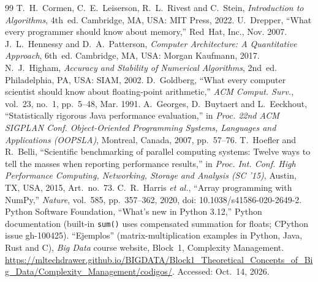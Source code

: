 \begin{thebibliography}{99}
 T.~H.~Cormen, C.~E.~Leiserson, R.~L.~Rivest and C.~Stein, \emph{Introduction to Algorithms}, 4th~ed. Cambridge, MA, USA: MIT Press, 2022.
 U.~Drepper, ``What every programmer should know about memory,'' Red~Hat, Inc., Nov. 2007.
 J.~L.~Hennessy and D.~A.~Patterson, \emph{Computer Architecture: A Quantitative Approach}, 6th~ed. Cambridge, MA, USA: Morgan Kaufmann, 2017.
 N.~J.~Higham, \emph{Accuracy and Stability of Numerical Algorithms}, 2nd~ed. Philadelphia, PA, USA: SIAM, 2002.
 D.~Goldberg, ``What every computer scientist should know about floating-point arithmetic,'' \emph{ACM Comput. Surv.}, vol.~23, no.~1, pp.~5--48, Mar. 1991.
 A.~Georges, D.~Buytaert and L.~Eeckhout, ``Statistically rigorous Java performance evaluation,'' in \emph{Proc. 22nd ACM SIGPLAN Conf. Object-Oriented Programming Systems, Languages and Applications (OOPSLA)}, Montreal, Canada, 2007, pp.~57--76.
 T.~Hoefler and R.~Belli, ``Scientific benchmarking of parallel computing systems: Twelve ways to tell the masses when reporting performance results,'' in \emph{Proc. Int. Conf. High Performance Computing, Networking, Storage and Analysis (SC '15)}, Austin, TX, USA, 2015, Art.~no.~73.
 C.~R.~Harris \emph{et al.}, ``Array programming with NumPy,'' \emph{Nature}, vol.~585, pp.~357--362, 2020, doi: 10.1038/s41586-020-2649-2.
 Python Software Foundation, ``What's new in Python 3.12,'' Python documentation (built-in \texttt{sum()} uses compensated summation for floats; CPython issue gh-100425).
 ``Ejemplos'' (matrix-multiplication examples in Python, Java, Rust and C), \emph{Big Data} course website, Block~1, Complexity Management. \url{https://mltechdrawer.github.io/BIGDATA/Block1_Theoretical_Concepts_of_Big_Data/Complexity_Management/codigos/}. Accessed: Oct.~14, 2026.
\end{thebibliography}
